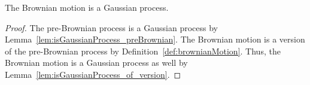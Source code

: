 \begin{lemma}\label{lem:isGaussianProcess_brownianMotion}
  The Brownian motion is a Gaussian process.
\end{lemma}

\begin{proof}
The pre-Brownian process is a Gaussian process by Lemma~\ref{lem:isGaussianProcess_preBrownian}.
The Brownian motion is a version of the pre-Brownian process by Definition~\ref{def:brownianMotion}.
Thus, the Brownian motion is a Gaussian process as well by Lemma~\ref{lem:isGaussianProcess_of_version}.
\end{proof}
